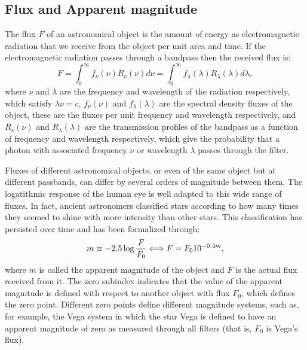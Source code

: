 \subsection{Flux and Apparent magnitude}
The flux $F$ of an astronomical object is the amount of energy as electromagnetic radiation that we receive from the object per unit area and time. If the electromagnetic radiation passes through a bandpass then the received flux is:
\begin{equation}
F = \int^{\infty}_0 f_\nu(\nu)R_\nu(\nu)d\nu = \int^{\infty}_0 f_\lambda(\lambda)R_\lambda(\lambda)d\lambda,
\label{eq:flux}
\end{equation}
where $\nu$ and $\lambda$ are the frequency and wavelength of the radiation respectively, which satisfy $\lambda \nu = c$, $f_\nu(\nu)$ and $f_\lambda(\lambda)$ are the spectral density fluxes of the object, these are the fluxes per unit frequency and wavelength respectively, and $R_\nu(\nu)$ and $R_\lambda(\lambda)$ are the transmission profiles of the bandpass as a function of frequency and wavelength respectively, which give the probability that a photon with associated frequency $\nu$ or wavelength $\lambda$ passes through the filter.

Fluxes of different astronomical objects, or even of the same object but at different passbands, can differ by several orders of magnitude between them. The logatithmic response of the human eye is well adapted to this wide range of fluxes. In fact, ancient astronomers classified stars according to how many times they seemed to shine with more intensity than other stars. This classification has persisted over time and has been formalized through: 
\begin{equation}
m \equiv -2.5\log{F \over F_0} \Longleftrightarrow F = F_0 10^{-0.4m},
\label{eq:mag}
\end{equation}
where $m$ is called the apparent magnitude of the object and $F$ is the actual flux received from it. The zero subindex indicates that the value of the apparent magnitude is defined with respect to another object with flux $F_0$, which defines the zero point. Different zero points define different magnitude systems, such as, for example, the Vega system in which the star Vega is defined to have an apparent magnitude of zero as measured through all filters (that is, $F_0$ is Vega's flux).

